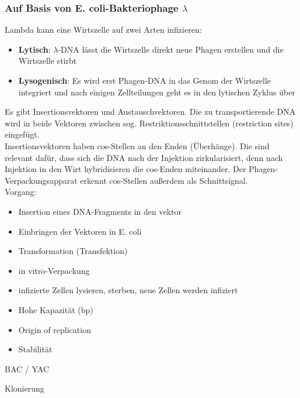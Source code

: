 \subsubsection{Auf Basis von E. coli-Bakteriophage $\lambda$}
Lambda kann eine Wirtszelle auf zwei Arten infizieren:  
\begin{itemize}
    \item \textbf{Lytisch}: $\lambda$-DNA lässt die Wirtszelle direkt neue Phagen erstellen und die Wirtszelle stirbt
    \item \textbf{Lysogenisch}: Es wird erst Phagen-DNA in das Genom der Wirtszelle integriert und nach einigen Zellteilungen geht es in den lytischen Zyklus über 
\end{itemize}
Es gibt Insertionsvektoren und Austauschvektoren. Die zu transportierende DNA wird in beide Vektoren zwischen sog. Restriktionsschnittstellen (restriction sites) eingefügt. \\ \newline
Insertionsvektoren haben cos-Stellen an den Enden (Überhänge). Die sind relevant dafür, dass sich die DNA nach der Injektion zirkularisiert, denn nach Injektion in den Wirt hybridisieren die cos-Enden miteinander. Der Phagen-Verpackungsapparat erkennt cos-Stellen außerdem als Schnittsignal. \\  
\noindent Vorgang:
\begin{itemize}
    \item Insertion eines DNA-Fragments in den \gls{vektor} 
    \item Einbringen der Vektoren in E. coli
    \item Transformation (Transfektion)
    \item in vitro-Verpackung
    \item infizierte Zellen lysieren, sterben, neue Zellen werden infiziert
\end{itemize}

\begin{mechanism}[title=Eigenschaften für Vektoren mit large-insert Klonen. Nennen sie zwei Beispiele.]
\begin{itemize}
    \item Hohe Kapazität (bp)
    \item Origin of replication
    \item Stabilität
\end{itemize}
BAC / YAC
\end{mechanism}
\begin{mechanism}[title=\gls{plasmid} Isolierung- Wie heißt dieser Vorgang?]
Klonierung
\end{mechanism}


